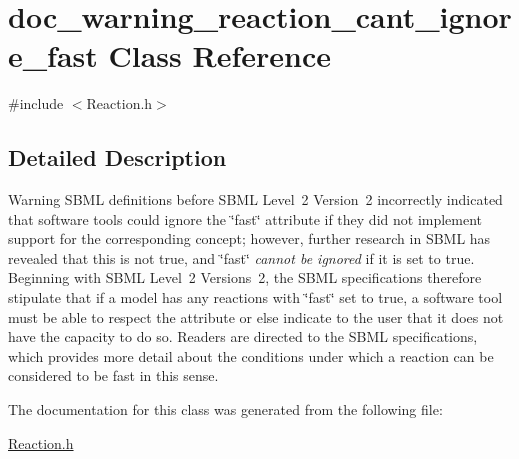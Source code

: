 \hypertarget{classdoc__warning__reaction__cant__ignore__fast}{}\section{doc\+\_\+warning\+\_\+reaction\+\_\+cant\+\_\+ignore\+\_\+fast Class Reference}
\label{classdoc__warning__reaction__cant__ignore__fast}


{\ttfamily \#include $<$Reaction.\+h$>$}



\subsection{Detailed Description}
\begin{DoxyWarning}{Warning}
S\+B\+ML definitions before S\+B\+ML Level~2 Version~2 incorrectly indicated that software tools could ignore the \char`\"{}fast\char`\"{} attribute if they did not implement support for the corresponding concept; however, further research in S\+B\+ML has revealed that this is not true, and \char`\"{}fast\char`\"{} {\itshape cannot be ignored} if it is set to {\ttfamily true}. Beginning with S\+B\+ML Level~2 Versions~2, the S\+B\+ML specifications therefore stipulate that if a model has any reactions with \char`\"{}fast\char`\"{} set to {\ttfamily true}, a software tool must be able to respect the attribute or else indicate to the user that it does not have the capacity to do so. Readers are directed to the S\+B\+ML specifications, which provides more detail about the conditions under which a reaction can be considered to be fast in this sense. 
\end{DoxyWarning}


The documentation for this class was generated from the following file\+:\begin{DoxyCompactItemize}
\item 
\hyperlink{_reaction_8h}{Reaction.\+h}\end{DoxyCompactItemize}

